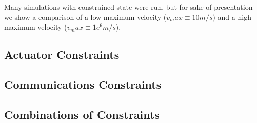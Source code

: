 \documentclass[10pt, conference, compsocconf]{IEEEtran}
\begin{document}
Many simulations with constrained state were run, but for sake of presentation we show a comparison of a low maximum velocity ($v_max \equiv 10m/s$) and a high maximum velocity ($v_max \equiv 1e^6m/s$).
%


\subsection{Actuator Constraints}



\subsection{Communications Constraints}


\subsection{Combinations of Constraints}
\end{document}
